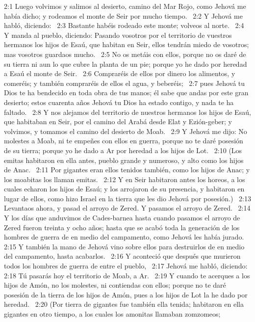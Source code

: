 2:1 Luego volvimos y salimos al desierto, camino del Mar Rojo, como Jehová me había dicho; y rodeamos el monte de Seir por mucho tiempo.  
2:2 Y Jehová me habló, diciendo:  
2:3 Bastante habéis rodeado este monte; volveos al norte.  
2:4 Y manda al pueblo, diciendo: Pasando vosotros por el territorio de vuestros hermanos los hijos de Esaú, que habitan en Seir, ellos tendrán miedo de vosotros; mas vosotros guardaos mucho.  
2:5 No os metáis con ellos, porque no os daré de su tierra ni aun lo que cubre la planta de un pie; porque yo he dado por heredad a Esaú el monte de Seir.  
2:6 Compraréis de ellos por dinero los alimentos, y comeréis; y también compraréis de ellos el agua, y beberéis;  
2:7 pues Jehová tu Dios te ha bendecido en toda obra de tus manos; él sabe que andas por este gran desierto; estos cuarenta años Jehová tu Dios ha estado contigo, y nada te ha faltado.  
2:8 Y nos alejamos del territorio de nuestros hermanos los hijos de Esaú, que habitaban en Seir, por el camino del Arabá desde Elat y Ezión-geber; y volvimos, y tomamos el camino del desierto de Moab.  
2:9 Y Jehová me dijo: No molestes a Moab, ni te empeñes con ellos en guerra, porque no te daré posesión de su tierra; porque yo he dado a Ar por heredad a los hijos de Lot.  
2:10 (Los emitas habitaron en ella antes, pueblo grande y numeroso, y alto como los hijos de Anac.  
2:11 Por gigantes eran ellos tenidos también, como los hijos de Anac; y los moabitas los llaman emitas.  
2:12 Y en Seir habitaron antes los horeos, a los cuales echaron los hijos de Esaú; y los arrojaron de su presencia, y habitaron en lugar de ellos, como hizo Israel en la tierra que les dio Jehová por posesión.)  
2:13 Levantaos ahora, y pasad el arroyo de Zered. Y pasamos el arroyo de Zered.  
2:14 Y los días que anduvimos de Cades-barnea hasta cuando pasamos el arroyo de Zered fueron treinta y ocho años; hasta que se acabó toda la generación de los hombres de guerra de en medio del campamento, como Jehová les había jurado. 
2:15 Y también la mano de Jehová vino sobre ellos para destruirlos de en medio del campamento, hasta acabarlos.  
2:16 Y aconteció que después que murieron todos los hombres de guerra de entre el pueblo,  
2:17 Jehová me habló, diciendo:  
2:18 Tú pasarás hoy el territorio de Moab, a Ar.  
2:19 Y cuando te acerques a los hijos de Amón, no los molestes, ni contiendas con ellos; porque no te daré posesión de la tierra de los hijos de Amón, pues a los hijos de Lot la he dado por heredad.  
2:20 (Por tierra de gigantes fue también ella tenida; habitaron en ella gigantes en otro tiempo, a los cuales los amonitas llamaban zomzomeos;  
